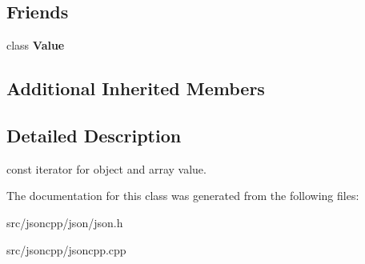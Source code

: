 \subsection*{Friends}
\begin{DoxyCompactItemize}
\item 
class {\bfseries Value}\hypertarget{classJson_1_1ValueConstIterator_aeceedf6e1a7d48a588516ce2b1983d6f}{}\label{classJson_1_1ValueConstIterator_aeceedf6e1a7d48a588516ce2b1983d6f}

\end{DoxyCompactItemize}
\subsection*{Additional Inherited Members}


\subsection{Detailed Description}
const iterator for object and array value. 



The documentation for this class was generated from the following files\+:\begin{DoxyCompactItemize}
\item 
src/jsoncpp/json/json.\+h\item 
src/jsoncpp/jsoncpp.\+cpp\end{DoxyCompactItemize}
